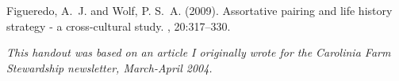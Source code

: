 \documentclass{tufte-handout}
\begin{document}

\begin{thebibliography}{99} %

Figueredo, A.~J. and Wolf, P. S.~A. (2009).
\newblock Assortative pairing and life history strategy - a cross-cultural
  study.
, 20:317--330.
 
\end{thebibliography}

\vspace{1cm}

\emph{This handout was based on an article I originally wrote for the Carolinia Farm Stewardship newsletter, March-April 2004.}
\end{document}
